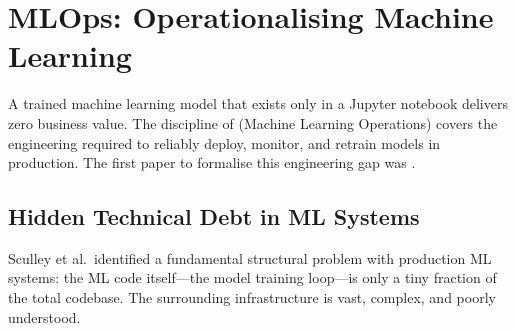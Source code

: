 \section{MLOps: Operationalising Machine Learning}
\label{sec:mlops}

A trained machine learning model that exists only in a Jupyter notebook
delivers zero business value. The discipline of  (Machine
Learning Operations) covers the engineering required to reliably deploy,
monitor, and retrain models in production. The first paper to formalise
this engineering gap was \autocite{MLTechnicalDebt2015}.

\subsection{Hidden Technical Debt in ML Systems}
\label{subsec:technical-debt}

Sculley et al.\ identified a fundamental structural problem with production
ML systems: the ML code itself---the model training loop---is only a tiny
fraction of the total codebase. The surrounding infrastructure is vast,
complex, and poorly understood.

